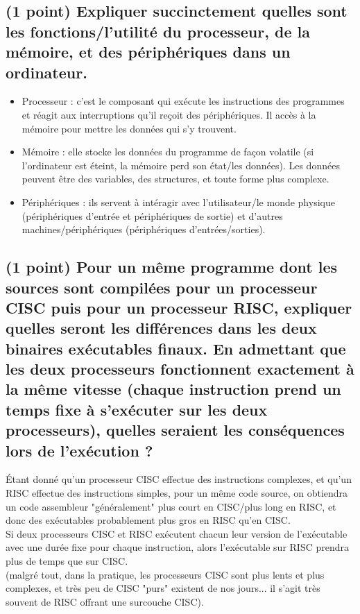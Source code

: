 \documentclass[11pt,a4paper]{article}
\begin{document}
\subsection{(1 point) Expliquer succinctement quelles sont les fonctions/l'utilité du processeur, de la mémoire, et des périphériques dans un ordinateur.}

\bigskip
\begin{itemize}
\item Processeur : c'est le composant qui exécute les instructions des programmes et réagit aux interruptions qu'il reçoit des périphériques. Il accès à la mémoire pour mettre les données qui s'y trouvent.
\item Mémoire : elle stocke les données du programme de façon volatile (si l'ordinateur est éteint, la mémoire perd son état/les données). Les données peuvent être des variables, des structures, et toute forme plus complexe.
\item Périphériques : ils servent à intéragir avec l'utilisateur/le monde physique (périphériques d'entrée et périphériques de sortie) et d'autres machines/périphériques (périphériques d'entrées/sorties).
\end{itemize}
\bigskip

\subsection{(1 point) Pour un même programme dont les sources sont compilées pour un processeur CISC puis pour un processeur RISC, expliquer quelles seront les différences dans les deux binaires exécutables finaux. En admettant que les deux processeurs fonctionnent exactement à la même vitesse (chaque instruction prend un temps fixe à s'exécuter sur les deux processeurs), quelles seraient les conséquences lors de l'exécution ?}

\bigskip
\'Etant donné qu'un processeur CISC effectue des instructions complexes, et qu'un RISC effectue des instructions simples, pour un même code source, on obtiendra un code assembleur "généralement" plus court en CISC/plus long en RISC, et donc des exécutables probablement plus gros en RISC qu'en CISC.\\
Si deux processeurs CISC et RISC exécutent chacun leur version de l'exécutable avec une durée fixe  pour chaque instruction, alors l'exécutable sur RISC prendra plus de temps que sur CISC.\\
(malgré tout, dans la pratique, les processeurs CISC sont plus lents et plus complexes, et très peu de CISC "purs" existent de nos jours... il s'agit très souvent de RISC offrant une surcouche CISC).
\bigskip
\end{document}
